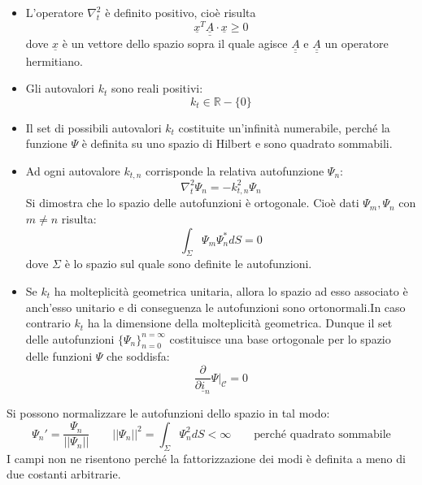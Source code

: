 \documentclass{book}
\begin{document}
    \begin{itemize}
        \item L'operatore $\nabla_{t} ^{2}$ è definito positivo, cioè risulta
        \begin{equation}
            \underline{x} ^{T} \underline{\underline{A}} \cdot \underline{x} \geq 0
        \end{equation}
        dove $\underline{x}$ è un vettore dello spazio sopra il quale agisce $\underline{\underline{A}}$ e $\underline{\underline{A}}$ un operatore hermitiano.
        \item Gli autovalori $k_{t}$ sono reali positivi:
        \begin{equation}
            k_{t} \in \mathbb{R} - \{0\}
        \end{equation}
        \item  Il set di possibili autovalori $k_{t}$ costituite un'infinità numerabile, perché la funzione 
        $\Psi$ è definita su uno spazio di Hilbert e sono quadrato sommabili.
        \item Ad ogni autovalore $k_{t,n}$ corrisponde la relativa autofunzione $\Psi_{n}$:
        \begin{equation}
            \nabla_{t} ^{2} \Psi_{n}=-k_{t,n} ^{2}\Psi_{n}
        \end{equation}
        Si dimostra che lo spazio  delle autofunzioni è ortogonale. Cioè dati $\Psi_{m}, \Psi_{n}$ con $m \neq n$ risulta:
        \begin{equation}
            \int_{\Sigma} \Psi_{m}\Psi_{n} ^{*}dS = 0
        \end{equation}
        dove $\Sigma$ è lo spazio sul quale sono definite le autofunzioni.
        \item Se $k_{t}$ ha molteplicità geometrica unitaria, allora lo spazio ad esso associato è anch'esso
        unitario e di conseguenza le autofunzioni sono ortonormali.In caso contrario $k_{t}$ ha la dimensione della molteplicità geometrica. Dunque il set delle autofunzioni $\{\Psi_{n}\} _{n = 0} ^{n= \infty}$ costituisce una base ortogonale
        per lo spazio delle funzioni $\Psi$ che soddisfa:
        \begin{equation}
            \frac{\partial}{\partial \underline{i}_{n}}\Psi|_{\mathcal{C}} = 0
        \end{equation}
    \end{itemize}
    Si possono normalizzare le autofunzioni dello spazio in tal modo:
    \begin{equation}
        \Psi_{n} ' = \frac{\Psi_{n}}{||\Psi_{n}||} \qquad ||\Psi_{n}||^{2} = \int_{\Sigma} \Psi^{2} _{n} dS < \infty \qquad \textrm{perché quadrato sommabile} 
    \end{equation}
    I campi non ne risentono perché la fattorizzazione dei modi è definita a meno di due costanti arbitrarie.
\end{document}

